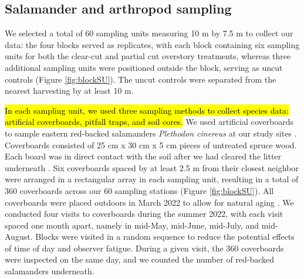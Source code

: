 \subsection*{Salamander and arthropod sampling}
\label{subsec:sampling}

We selected a total of 60 sampling units measuring 10 m by 7.5 m to collect our data: the four blocks served as replicates, 
with each block containing six sampling units for both the clear-cut and partial cut overstory treatments, 
whereas three additional sampling units were positioned outside the block, serving as uncut controls (Figure \ref*{fig:blockSU}). 
The uncut controls were separated from the nearest harvesting by at least 10 m.

\hl{In each sampling unit, we used three sampling methods to collect species data: artificial coverboards, pitfall traps, and soil cores.}
We used artificial coverboards to sample eastern red-backed salamanders \textit{Plethodon cinereus} at our study sites \citep{hydeSamplingPlethodontidSalamanders2001,mooreComparisonPopulationEastern2009c,hesedUncoveringSalamanderEcology2012,Mazerolle2021Woodlandsalamander}. 
Coverboards consisted of 25 cm x 30 cm x 5 cm pieces of untreated spruce wood. Each board was in direct contact with the soil after we had cleared the litter underneath \citep{Mazerolle2021Woodlandsalamander}. 
Six coverboards spaced by at least 2.5 m from their closest neighbor were arranged in a rectangular array in each sampling unit, resulting in a total of 360 coverboards across our 60 sampling stations (Figure \ref{fig:blockSU}). 
All coverboards were placed outdoors in March 2022 to allow for natural aging \citep{hedrickEffectsCoverboardAge2021,Grasser2014Effectscover}. 
We conducted four visits to coverboards during the summer 2022, with each visit spaced one month apart, namely in mid-May, mid-June, mid-July, and mid-August. 
Blocks were visited in a random sequence to reduce the potential effects of time of day and observer fatigue. 
During a given visit, the 360 coverboards were inspected on the same day, and we counted the number of red-backed salamanders underneath. 

